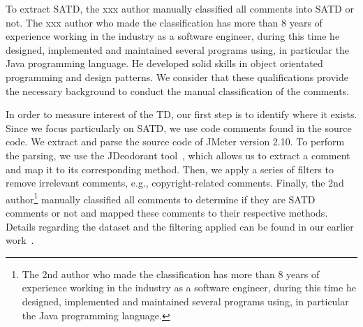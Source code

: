 To extract SATD, the xxx author manually classified all comments into SATD or not.
The xxx author who made the classification has more than 8 years of experience working in the industry as a software engineer, during this time he designed, implemented and maintained several programs using, in particular the Java programming language. He developed solid skills in object orientated programming and design patterns. We consider that these qualifications provide the necessary background to conduct the manual classification of the comments.
\fi


In order to measure interest of the TD, our first step is to identify where it exists. Since we focus particularly on SATD, we use code comments found in the source code. We extract and parse the source code of JMeter version 2.10. To perform the parsing, we use the {\sc JDeodorant} tool~\cite{Tsantalis2008CSMR}, which allows us to extract a comment and map it to its corresponding method. Then, we apply a series of filters to remove irrelevant comments, e.g., copyright-related comments. Finally, the 2nd author\footnote{The 2nd author who made the classification has more than 8 years of experience working in the industry as a software engineer, during this time he designed, implemented and maintained several programs using, in particular the Java programming language.} manually classified all comments to determine if they are SATD comments or not and mapped these comments to their respective methods.  Details regarding the dataset and the filtering applied can be found in our earlier work~\cite{Maldonado2015MTD}.




